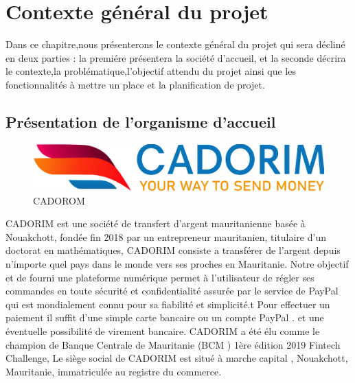 \chapter{Contexte général du projet}
Dans ce chapitre,nous présenterons le contexte général du projet qui sera décliné en deux parties : la premiére présentera la société d'accueil, et la seconde décrira le contexte,la  problématique,l'objectif attendu du projet ainsi que les fonctionnalités à mettre un place et la  planification de projet.                                                                                                                                                                                                                                                                                                                                                                                                                                                                                                                                                                                                                                                                                                                                                                                                                                                                                                          
\label{chap:introduction}
\section{Présentation de l'organisme d'accueil}
\begin{figure}[h]
	\includegraphics[scale=0.14]{./Template LaTeX/Images/cado_logo.png}
	\centering
	\caption{CADOROM}
\end{figure}
CADORIM est une société de transfert d’argent mauritanienne basée à Nouakchott,
fondée fin 2018 par un entrepreneur mauritanien, titulaire d'un doctorat en
mathématiques,
CADORIM consiste a transférer de l’argent depuis n’importe quel pays dans le
monde vers ses proches en Mauritanie. Notre objectif et de fourni une plateforme
numérique permet à l’utilisateur de régler ses commandes en toute sécurité et
confidentialité assurée par le service de PayPal qui est mondialement connu pour sa
fiabilité et simplicité.t Pour effectuer un paiement il suffit d'une simple carte bancaire
ou un compte PayPal . et une éventuelle possibilité de virement bancaire.
CADORIM a été élu comme le champion de Banque Centrale de Mauritanie (BCM )
1ère édition 2019 Fintech Challenge,
Le siège social de CADORIM est situé à marche capital , Nouakchott, Mauritanie,
immatriculée au registre du commerce.
